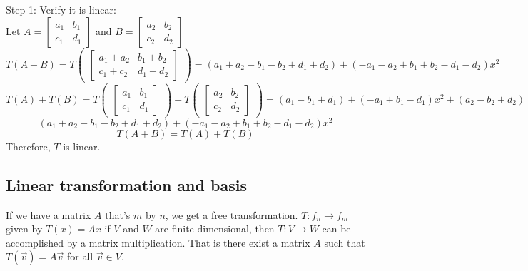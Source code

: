 {    Step 1: Verify it is linear: \\
    Let $A = \begin{bmatrix} a_1 & b_1 \\ c_1 & d_1 \end{bmatrix}$ and $B = \begin{bmatrix} a_2 & b_2 \\ c_2 & d_2 \end{bmatrix}$ \\
    \[
        T(A + B) = T\begin{pmatrix}
            \begin{bmatrix} a_1 + a_2 & b_1 + b_2 \\ c_1 + c_2 & d_1 + d_2 \end{bmatrix}
        \end{pmatrix}
        = (a_1 + a_2 - b_1 - b_2 + d_1 + d_2) + (-a_1 - a_2 + b_1 + b_2 - d_1 - d_2)x^2
    \]
    \[
        T(A) + T(B) = T\begin{pmatrix}
            \begin{bmatrix} a_1 & b_1 \\ c_1 & d_1 \end{bmatrix}
        \end{pmatrix} + T\begin{pmatrix}
            \begin{bmatrix} a_2 & b_2 \\ c_2 & d_2 \end{bmatrix}
        \end{pmatrix}
        = (a_1 - b_1 + d_1) + (-a_1 + b_1 - d_1)x^2 + (a_2 - b_2 + d_2) + (-a_2 + b_2 - d_2)x^2
    \]
    \[
        (a_1 + a_2 - b_1 - b_2 + d_1 + d_2) + (-a_1 - a_2 + b_1 + b_2 - d_1 - d_2)x^2
    \]
    \[
        T(A + B) = T(A) + T(B)
    \]
    Therefore, $T$ is linear. \\

}



\subsection{Linear transformation and basis}

If we have a matrix $A$ that's $m$ by $n$, we get a free transformation. 
$T: f_n \to f_m$ given by $T(x) = Ax$ if $V$ and $W$ are finite-dimensional, then $T: V \to W$ can be accomplished by a matrix multiplication. That is there exist a matrix $A$ such that $T(\vec{v}) = A\vec{v}$ for all $\vec{v} \in V$.

